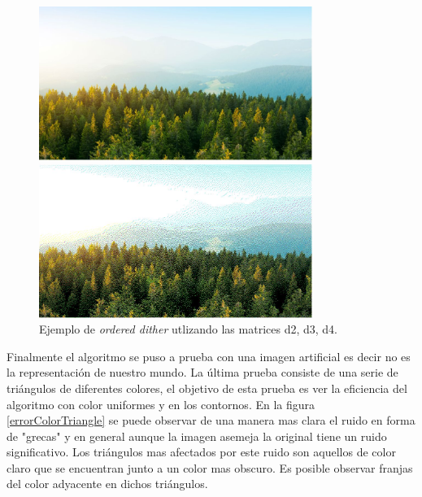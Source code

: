 \documentclass[conference]{IEEEtran}
\begin{document}
\begin{figure}[htbp]
\centerline{\includegraphics[height=50mm]{code/bosque}}
\centerline{\includegraphics[height=50mm]{code/bosque1}}
\caption{Ejemplo de \textit{ordered dither} utlizando las matrices d2, d3, d4.}
\label{errorColorTree}
\end{figure}


Finalmente el algoritmo se puso a prueba con una imagen artificial es decir no es la representación
de nuestro mundo. La última prueba consiste de una serie de triángulos de diferentes colores, el objetivo de  esta prueba es ver la eficiencia del algoritmo con color uniformes y en los contornos. En la figura \ref{errorColorTriangle} se puede observar de una manera mas clara el ruido en forma de "grecas" y en general aunque la imagen asemeja la original tiene un ruido significativo. Los triángulos mas afectados por este ruido son aquellos de color claro que se encuentran junto a un color mas obscuro. Es posible observar  franjas del color adyacente en dichos triángulos.
\end{document}
